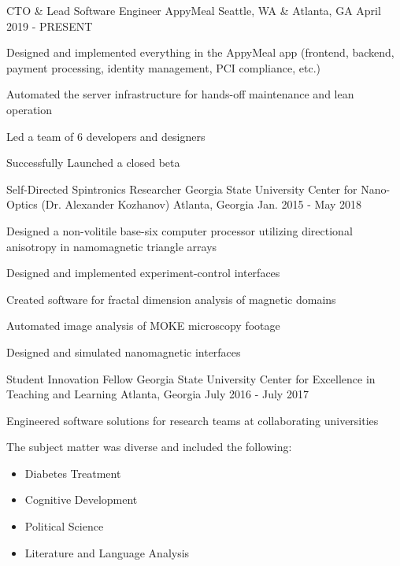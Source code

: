 \begin{cventries}
\cventry
{CTO \& Lead Software Engineer} %
{AppyMeal} %
{Seattle, WA \& Atlanta, GA} %
{April 2019 - PRESENT} %
{ %
\begin{cvitems}
\item {Designed and implemented everything in the AppyMeal app (frontend, backend, payment processing, \newline identity management, PCI compliance, etc.)}
\item {Automated the server infrastructure for hands-off maintenance and lean operation}
\item {Led a team of 6 developers and designers}
\item {Successfully Launched a closed beta}
\end{cvitems}
}


\cventry
{Self-Directed Spintronics Researcher} %
{Georgia State University Center for Nano-Optics (Dr. Alexander Kozhanov)} %
{Atlanta, Georgia} %
{Jan. 2015 - May 2018} %
{ %
\begin{cvitems}
\item {Designed a non-volitile base-six computer processor utilizing directional anisotropy in namomagnetic \newline triangle arrays}
\item {Designed and implemented experiment-control interfaces}
\item {Created software for fractal dimension analysis of magnetic domains}
\item {Automated image analysis of MOKE microscopy footage}
\item {Designed and simulated nanomagnetic interfaces}
\end{cvitems} 
}


\cventry
{Student Innovation Fellow} %
{Georgia State University Center for Excellence in Teaching and Learning} %
{Atlanta, Georgia} %
{July 2016 - July 2017} %
{ %
\begin{cvitems}
\item {Engineered software solutions for research teams at collaborating universities}
\item {The subject matter was diverse and included the following:}
\begin{itemize}
\item{Diabetes Treatment}
\item{Cognitive Development}
\item{Political Science}
\item{Literature and Language Analysis}
\end{itemize}
\end{cvitems}
}


\end{cventries}
